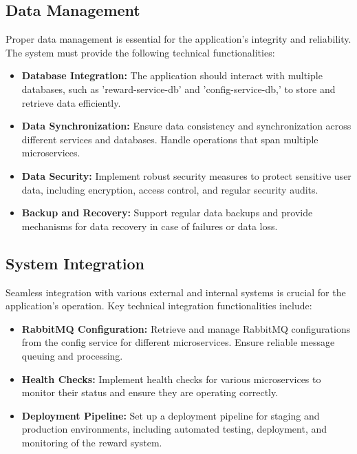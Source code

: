 \subsection{Data Management}
Proper data management is essential for the application's integrity and reliability. The system must provide the following technical functionalities:

\begin{itemize}
    \item \textbf{Database Integration:} The application should interact with multiple databases, such as 'reward-service-db' and 'config-service-db,' to store and retrieve data efficiently.
    \item \textbf{Data Synchronization:} Ensure data consistency and synchronization across different services and databases. Handle operations that span multiple microservices.
    \item \textbf{Data Security:} Implement robust security measures to protect sensitive user data, including encryption, access control, and regular security audits.
    \item \textbf{Backup and Recovery:} Support regular data backups and provide mechanisms for data recovery in case of failures or data loss.
\end{itemize}

\subsection{System Integration}
Seamless integration with various external and internal systems is crucial for the application's operation. Key technical integration functionalities include:

\begin{itemize}
    \item \textbf{RabbitMQ Configuration:} Retrieve and manage RabbitMQ configurations from the config service for different microservices. Ensure reliable message queuing and processing.
    \item \textbf{Health Checks:} Implement health checks for various microservices to monitor their status and ensure they are operating correctly.
    \item \textbf{Deployment Pipeline:} Set up a deployment pipeline for staging and production environments, including automated testing, deployment, and monitoring of the reward system.
\end{itemize}


